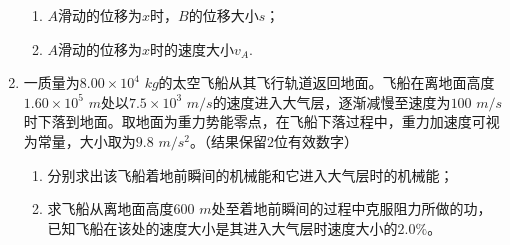 \begin{enumerate}[leftmargin=0em]
\begin{enumerate}
\item 
$ A $滑动的位移为$ x $时，$ B $的位移大小$ s $；


\item 
$ A $滑动的位移为$ x $时的速度大小$ v_{A} $.

\end{enumerate}
\begin{figure}[h!]
\flushright

\end{figure}






\newpage
\item 
{}
一质量为$ 8.00 \times 10^4 $ $ kg $的太空飞船从其飞行轨道返回地面。飞船在离地面高度$ 1.60 \times 10^5 $ $ m $处以$ 7.5 \times 10^3 $ $ m/s $的速度进入大气层，逐渐减慢至速度为$ 100 $ $ m/s $时下落到地面。取地面为重力势能零点，在飞船下落过程中，重力加速度可视为常量，大小取为$ 9.8 $ $ m/s^{2} $。（结果保留$ 2 $位有效数字）
\begin{enumerate}
\renewcommand{\labelenumi}{\arabic{enumi}.}
\item
分别求出该飞船着地前瞬间的机械能和它进入大气层时的机械能；
\item 
求飞船从离地面高度$ 600 $ $ m $处至着地前瞬间的过程中克服阻力所做的功，已知飞船在该处的速度大小是其进入大气层时速度大小的$ 2.0 \% $。




\end{enumerate}


\end{enumerate}
